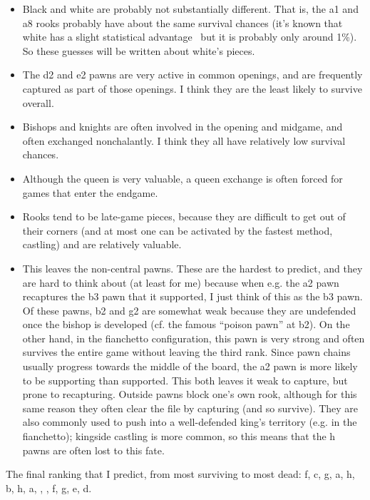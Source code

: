 \documentclass[twocolumn]{article}
\begin{document}
\begin{itemize}
\item Black and white are probably not substantially different. That
  is, the a1 and a8 rooks probably have about the same survival
  chances (it's known that white has a slight statistical
  advantage~\cite{chesstego} but it is probably only around 1\%). So
  these guesses will be written about white's pieces.
\item The d2 and e2 pawns are very active in common openings, and
  are frequently captured as part of those openings. I think they
  are the least likely to survive overall.
\item Bishops and knights are often involved in the opening and
  midgame, and often exchanged nonchalantly. I think they all have
  relatively low survival chances.
\item Although the queen is very valuable, a queen exchange is often
  forced for games that enter the endgame.
\item Rooks tend to be late-game pieces, because they are difficult
  to get out of their corners (and at most one can be activated
  by the fastest method, castling) and are relatively valuable.
\item This leaves the non-central pawns. These are the hardest to
  predict, and they are hard to think about (at least for me) because
  when e.g. the a2 pawn recaptures the b3 pawn that it supported, I
  just think of this as the b3 pawn. Of these pawns, b2 and g2 are
  somewhat weak because they are undefended once the bishop is
  developed (cf. the famous ``poison pawn'' at b2). On the other hand,
  in the fianchetto configuration, this pawn is very strong and often
  survives the entire game without leaving the third rank. Since pawn
  chains usually progress towards the middle of the board, the a2 pawn
  is more likely to be supporting than supported. This both leaves it
  weak to capture, but prone to recapturing. Outside pawns block one's
  own rook, although for this same reason they often clear the file by
  capturing (and so survive). They are also commonly used to push into
  a well-defended king's territory (e.g. in the fianchetto); kingside
  castling is more common, so this means that the h pawns are often
  lost to this fate.
\end{itemize}

The final ranking that I predict, from most surviving to most dead:
\pawn f, \pawn c, \pawn g, \pawn a, \pawn h, \pawn b, \rook h, \rook a,
\king, \queen, \bishop f, \knight g, \pawn e, \pawn d.
\end{document}
